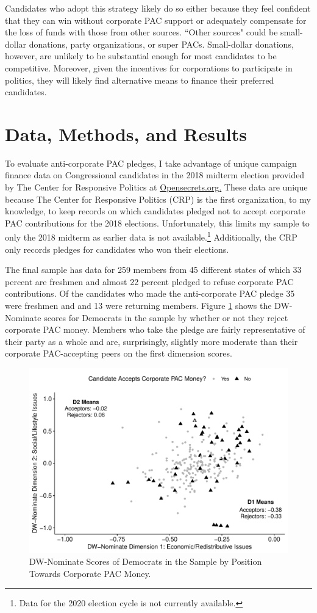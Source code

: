 \documentclass[12pt]{article}
\begin{document}
Candidates who adopt this strategy likely do so either because they feel confident that they can win without corporate PAC support or adequately compensate for the loss of funds with those from other sources. ``Other sources" could be small-dollar donations, party organizations, or super PACs. Small-dollar donations, however, are unlikely to be substantial enough for most candidates to be competitive. Moreover, given the incentives for corporations to participate in politics, they will likely find alternative means to finance their preferred candidates.


\section{Data, Methods, and Results}

To evaluate anti-corporate PAC pledges, I take advantage of unique campaign finance data on Congressional candidates in the 2018 midterm election provided by The Center for Responsive Politics at \href{https://www.opensecrets.org}{Opensecrets.org.} These data are unique because The Center for Responsive Politics (CRP) is the first organization, to my knowledge, to keep records on which candidates pledged not to accept corporate PAC contributions for the 2018 elections. Unfortunately, this limits my sample to only the 2018 midterm as earlier data is not available.\footnote{Data for the 2020 election cycle is not currently available.} Additionally, the CRP only records pledges for candidates who won their elections.

The final sample has data for 259 members from 45 different states of which 33 percent are freshmen and almost 22 percent pledged to refuse corporate PAC contributions. Of the candidates who made the anti-corporate PAC pledge 35 were freshmen and and 13 were returning members. Figure \ref{fig: nominate plot} shows the DW-Nominate scores for Democrats in the sample by whether or not they reject corporate PAC money. Members who take the pledge are fairly representative of their party as a whole and are, surprisingly, slightly more moderate than their corporate PAC-accepting peers on the first dimension scores. 

\begin{figure}[!htb]
    \centering
    \includegraphics[width=0.75\linewidth]{nominate_plot.pdf}
    \caption{DW-Nominate Scores of Democrats in the Sample by Position Towards Corporate PAC Money.}
    \label{fig: nominate plot}
\end{figure}
\end{document}
